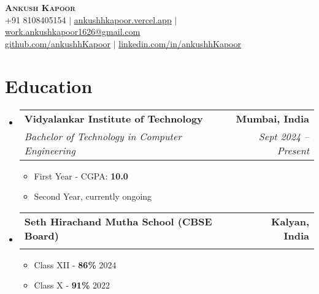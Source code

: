 \documentclass[letterpaper,11pt]{article}
\makeatletter
\newcommand{\resumeItem}[1]{
  \item\small{
    {#1 \vspace{-2pt}}
  }
}
\newcommand{\resumeSubheading}[4]{
  \vspace{-2pt}\item
    \begin{tabular*}{1.0\textwidth}[t]{l@{\extracolsep{\fill}}r}
      \vspace{-2pt}\textbf{#1} & \textbf{\small #2} \\
      \textit{\small#3} & \textit{\small #4} \\
    \end{tabular*}\vspace{-7pt}
}
\newcommand{\resumeSubHeadingListStart}{\begin{itemize}[leftmargin=0.0in, label={}]}
\newcommand{\resumeSubHeadingListEnd}{\end{itemize}}
\newcommand{\resumeItemListStart}{\begin{itemize}}
\newcommand{\resumeItemListEnd}{\end{itemize}\vspace{-5pt}}
\makeatother
\begin{document}

\begin{center}
    {\huge \scshape \textbf{Ankush Kapoor}} \\ \vspace{3pt}
    \small
    +91 8108405154 $|$  \href{https://ankushhkapoor.vercel.app}{\underline{ankushhkapoor.vercel.app}} $|$
    \href{mailto:work.ankushkapoor1626@gmail.com}{\underline{work.ankushkapoor1626@gmail.com}} \\
    \href{https://github.com/ankushhKapoor}{\underline{github.com/ankushhKapoor}} $|$
    \href{https://linkedin.com/in/ankushhKapoor}{\underline{linkedin.com/in/ankushhKapoor}}    \vspace{-8pt}
\end{center}


\section{Education}
    \resumeSubHeadingListStart
        \resumeSubheading
            {Vidyalankar Institute of Technology}{Mumbai, India}
            {Bachelor of Technology in Computer Engineering}{Sept 2024 -- Present}
            \resumeItemListStart
                \resumeItem{First Year - CGPA: \textbf{10.0}}
                \resumeItem{Second Year, currently ongoing}
            \resumeItemListEnd

        \resumeSubheading
            {Seth Hirachand Mutha School (CBSE Board)}{Kalyan, India}
            {}{}
            \vspace{-16pt}\resumeItemListStart
                \resumeItem{Class XII - \textbf{86\%} \hspace{5.984in} 2024}
                \resumeItem{Class X - \textbf{91\%} \hspace{6.083in} 2022}
            \resumeItemListEnd
    \resumeSubHeadingListEnd
\vspace{-15pt}
\end{document}

